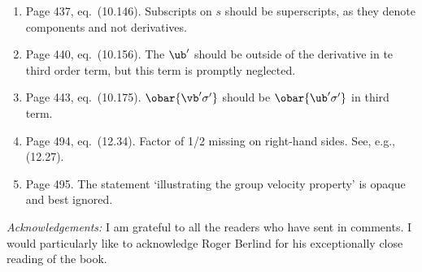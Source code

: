 \documentclass[10pt]{article}
\newcommand{\eq}{eq.\ } \newcommand{\Eq}{Eq.\ }
\begin{document}
\begin{enumerate}
\item Page 437, \eq (10.146). Subscripts on $s$ should be superscripts, as they denote components and not derivatives. 

\item Page 440, \eq (10.156). The $\ub'$ should be outside of the derivative in te third order term, but this term is promptly neglected. 

\item Page 443, \eq (10.175). $\obar{\vb' \sigma'}$ should be $\obar{\ub' \sigma'}$ in third term.

\item Page 494, \eq (12.34). Factor of 1/2 missing on right-hand sides. See, e.g., (12.27). 

\item Page 495. The statement `illustrating the group velocity property' is opaque and best ignored. 


\end{enumerate}

\noindent \textit{Acknowledgements:} I am grateful to all the readers who have sent in comments. I would particularly like to acknowledge Roger Berlind for his exceptionally close reading of the book.
\end{document}
